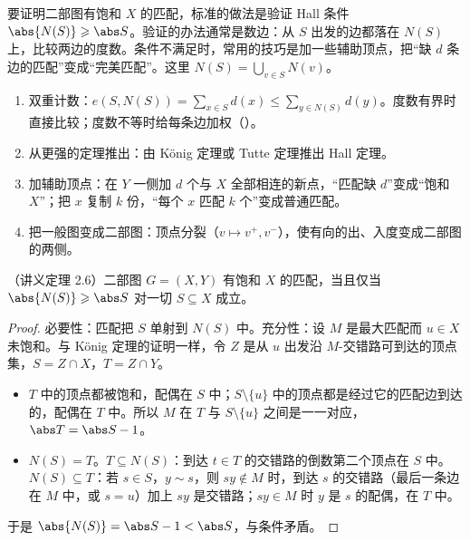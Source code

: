 \label{lec:hall-condition}

要证明二部图有饱和 $X$ 的匹配，标准的做法是验证 Hall 条件 $\abs{N(S)}\geqslant\abs S$。验证的办法通常是数边：从 $S$ 出发的边都落在 $N(S)$ 上，比较两边的度数。条件不满足时，常用的技巧是加一些辅助顶点，把“缺 $d$ 条边的匹配”变成“完美匹配”。这里 $N(S)=\bigcup_{v\in S}N(v)$。


\begin{enumerate}
\item 双重计数：$e(S,N(S))=\sum_{x\in S}d(x)\leqslant\sum_{y\in N(S)}d(y)$。度数有界时直接比较；度数不等时给每条边加权（）。
\item 从更强的定理推出：由 König 定理或 Tutte 定理推出 Hall 定理。
\item 加辅助顶点：在 $Y$ 一侧加 $d$ 个与 $X$ 全部相连的新点，“匹配缺 $d$”变成“饱和 $X$”；把 $x$ 复制 $k$ 份，“每个 $x$ 匹配 $k$ 个”变成普通匹配。
\item 把一般图变成二部图：顶点分裂（$v\mapsto v^+,v^-$），使有向的出、入度变成二部图的两侧。
\end{enumerate}

\begin{theorem}[Hall]\label{thm:hall-condition:hall}
（讲义定理 2.6）二部图 $G=(X,Y)$ 有饱和 $X$ 的匹配，当且仅当 $\abs{N(S)}\geqslant\abs S$ 对一切 $S\subseteq X$ 成立。
\end{theorem}
\begin{proof}
必要性：匹配把 $S$ 单射到 $N(S)$ 中。充分性：设 $M$ 是最大匹配而 $u\in X$ 未饱和。与 König 定理的证明一样，令 $Z$ 是从 $u$ 出发沿 $M$-交错路可到达的顶点集，$S=Z\cap X$，$T=Z\cap Y$。
\begin{itemize}
\item $T$ 中的顶点都被饱和，配偶在 $S$ 中；$S\setminus\{u\}$ 中的顶点都是经过它的匹配边到达的，配偶在 $T$ 中。所以 $M$ 在 $T$ 与 $S\setminus\{u\}$ 之间是一一对应，$\abs T=\abs S-1$。
\item $N(S)=T$。$T\subseteq N(S)$：到达 $t\in T$ 的交错路的倒数第二个顶点在 $S$ 中。$N(S)\subseteq T$：若 $s\in S$，$y\sim s$，则 $sy\notin M$ 时，到达 $s$ 的交错路（最后一条边在 $M$ 中，或 $s=u$）加上 $sy$ 是交错路；$sy\in M$ 时 $y$ 是 $s$ 的配偶，在 $T$ 中。
\end{itemize}
于是 $\abs{N(S)}=\abs S-1<\abs S$，与条件矛盾。
\end{proof}

